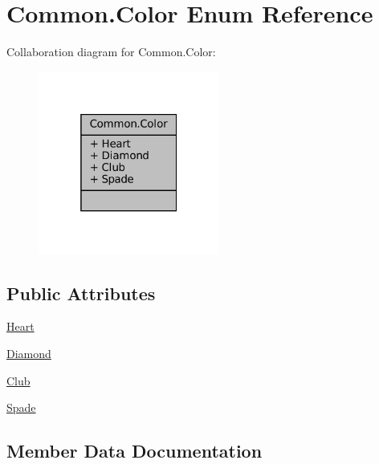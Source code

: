 \hypertarget{enumCommon_1_1Color}{}\section{Common.\+Color Enum Reference}
\label{enumCommon_1_1Color}


Collaboration diagram for Common.\+Color\+:
\nopagebreak
\begin{figure}[H]
\begin{center}
\leavevmode
\includegraphics[width=169pt]{enumCommon_1_1Color__coll__graph}
\end{center}
\end{figure}
\subsection*{Public Attributes}
\begin{DoxyCompactItemize}
\item 
\mbox{\hyperlink{enumCommon_1_1Color_aef9e92e2320c284704b9892e75bf8348}{Heart}}
\item 
\mbox{\hyperlink{enumCommon_1_1Color_a381cca0ea5d34bf5485690ec7d062ce4}{Diamond}}
\item 
\mbox{\hyperlink{enumCommon_1_1Color_a42ab11d21245c4e7bb94bd225cb54e13}{Club}}
\item 
\mbox{\hyperlink{enumCommon_1_1Color_a29e2b0d9c5ccdf8a1d449c41ebffc5d7}{Spade}}
\end{DoxyCompactItemize}


\subsection{Member Data Documentation}
\mbox{\label{enumCommon_1_1Color_a42ab11d21245c4e7bb94bd225cb54e13}} 
